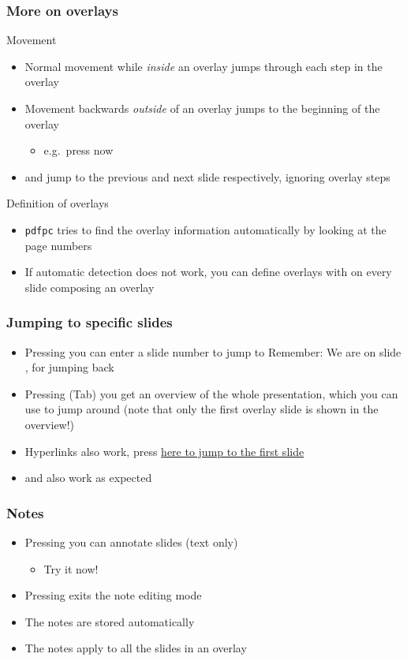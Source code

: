 \documentclass{beamer}
\newcommand{\singleitem}[1]{\begin{itemize}\item #1\end{itemize}}
\newcommand{\pdfpc}{\texttt{pdfpc}\xspace}
\begin{document}
\begin{frame}
  \frametitle{More on overlays}
  \begin{block}{Movement}
    \begin{itemize}
      \item Normal movement while \emph{inside} an overlay jumps through each step
        in the overlay
      \item Movement backwards \emph{outside} of an overlay jumps to the beginning
        of the overlay
        \singleitem{e.g.\ press \PgUp now}
      \item \UArrow and \DArrow jump to the previous and next slide respectively,
        ignoring overlay steps
    \end{itemize}
  \end{block}
  \begin{block}{Definition of overlays}
    \begin{itemize}
      \item \pdfpc tries to find the overlay information automatically by
        looking at the page numbers
      \item If automatic detection does not work, you can define overlays with
         on every slide composing an overlay
    \end{itemize}
  \end{block}
\end{frame}

\begin{frame}
  \frametitle{Jumping to specific slides}
  \begin{itemize}
    \item Pressing  you can enter a slide number to jump to
    \alert{Remember:} We are on slide \insertframenumber, for jumping back
    \item Pressing \Tab (Tab) you get an overview of the whole presentation,
      which you can use to jump around (note that only the first overlay slide
      is shown in the overview!)
    \item Hyperlinks also work, press \hyperlink{titlePage}{here to jump to the
      first slide}
    \item \Home and \End also work as expected
  \end{itemize}
\end{frame}

\begin{frame}
  \frametitle{Notes}
  \begin{itemize}
    \item Pressing  you can annotate slides (text only)
      \singleitem{Try it now!}
    \item Pressing \Esc exits the note editing mode
    \item The notes are stored automatically
    \item The notes apply to all the slides in an overlay
  \end{itemize}
\end{frame}
\end{document}
